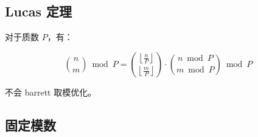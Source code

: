 \inputminted[mathescape]{cpp}{math/gcd/fast_gcd.cpp}

\subsection{Lucas 定理}

对于质数 $P$，有：

\[
\binom{n}{m}\bmod P =
\binom{\left\lfloor\frac{n}{P}\right\rfloor}{\left\lfloor\frac{m}{P}\right\rfloor}
\cdot \binom{n\bmod P}{m\bmod P}\bmod P
\]

不会 barrett 取模优化。

\subsection{固定模数}

\inputminted{cpp}{math/modint/static_modint.cpp}
